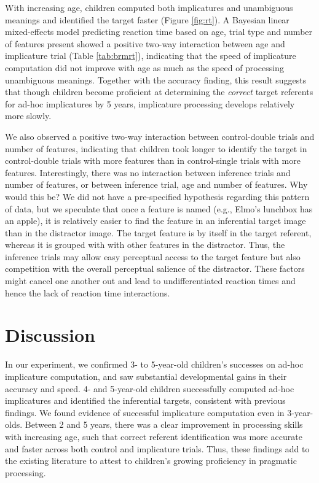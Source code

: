 \documentclass[mask,man]{apa6}
\theoremstyle{definition}
\theoremstyle{definition}
\theoremstyle{definition}
\theoremstyle{remark}
\begin{document}
With increasing age, children computed both implicatures and unambiguous
meanings and identified the target faster (Figure \ref{fig:rt}). A
Bayesian linear mixed-effects model predicting reaction time based on
age, trial type and number of features present showed a positive two-way
interaction between age and implicature trial (Table \ref{tab:brmrt}),
indicating that the speed of implicature computation did not improve
with age as much as the speed of processing unambiguous meanings.
Together with the accuracy finding, this result suggests that though
children become proficient at determining the \emph{correct} target
referents for ad-hoc implicatures by 5 years, implicature processing
develops relatively more slowly.

We also observed a positive two-way interaction between control-double
trials and number of features, indicating that children took longer to
identify the target in control-double trials with more features than in
control-single trials with more features. Interestingly, there was no
interaction between inference trials and number of features, or between
inference trial, age and number of features. Why would this be? We did
not have a pre-specified hypothesis regarding this pattern of data, but
we speculate that once a feature is named (e.g., Elmo's lunchbox has an
apple), it is relatively easier to find the feature in an inferential
target image than in the distractor image. The target feature is by
itself in the target referent, whereas it is grouped with with other
features in the distractor. Thus, the inference trials may allow easy
perceptual access to the target feature but also competition with the
overall perceptual salience of the distractor. These factors might
cancel one another out and lead to undifferentiated reaction times and
hence the lack of reaction time interactions.

\section{Discussion}\label{discussion}

In our experiment, we confirmed 3- to 5-year-old children's successes on
ad-hoc implicature computation, and saw substantial developmental gains
in their accuracy and speed. 4- and 5-year-old children successfully
computed ad-hoc implicatures and identified the inferential targets,
consistent with previous findings. We found evidence of successful
implicature computation even in 3-year-olds. Between 2 and 5 years,
there was a clear improvement in processing skills with increasing age,
such that correct referent identification was more accurate and faster
across both control and implicature trials. Thus, these findings add to
the existing literature to attest to children's growing proficiency in
pragmatic processing.
\end{document}
